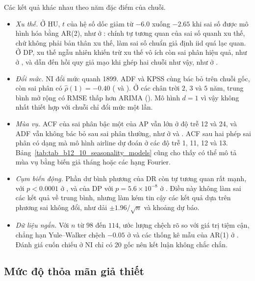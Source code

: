 Các kết quả khác nhau theo năm đặc điểm của chuỗi.
\begin{itemize}[leftmargin=*,itemsep=2pt]
\item \emph{Xu thế.} Ở HU, $t$ của hệ số dốc giảm từ $-6.0$ xuống $-2.65$ khi sai số được mô hình hóa bằng AR(2), như ở : chính tự tương quan của sai số quanh xu thế, chứ không phải bản thân xu thế, làm sai số chuẩn giả định iid quá lạc quan. Ở DP, xu thế ngẫu nhiên khiến trừ xu thế vô ích còn sai phân hiệu quả, như ở , và dẫn đến hồi quy giả mạo khi ghép hai chuỗi như vậy, như ở .
\item \emph{Đổi mức.} NI đổi mức quanh 1899. ADF và KPSS cùng bác bỏ trên chuỗi gốc, còn sai phân có $\hat\rho(1)=-0.40$ ( và ). Ở các chân trời $2$, $3$ và $5$ năm, trung bình mở rộng có RMSE thấp hơn ARIMA (). Mô hình $d=1$ vì vậy không nhất thiết hợp với chuỗi chỉ đổi mức một lần.
\item \emph{Mùa vụ.} ACF của sai phân bậc một của AP vẫn lớn ở độ trễ 12 và 24, và ADF vẫn không bác bỏ sau sai phân thường, như ở  và . ACF sau hai phép sai phân có dạng mà mô hình airline dự đoán ở các độ trễ 1, 11, 12 và 13. Bảng~\ref{tab:tab_b12_10_seasonality_models} cũng cho thấy có thể mô tả mùa vụ bằng biến giả tháng hoặc các hạng Fourier.
\item \emph{Cụm biến động.} Phần dư bình phương của DR còn tự tương quan rất mạnh, với $p<0.0001$ ở , và của DP với $p=5.6\times10^{-8}$ ở . Điều này không làm sai các kết quả về trung bình, nhưng làm kém tin cậy các kết quả dựa trên phương sai không đổi, như dải $\pm1.96/\sqrt n$ và khoảng dự báo.
\item \emph{Dữ liệu ngắn.} Với $n$ từ $98$ đến $114$, ước lượng chệch rõ so với giá trị tiệm cận, chẳng hạn Yule--Walker chệch $-0.05$ ở  và các thống kê mẫu của AR(1) ở . Đánh giá cuốn chiếu ở NI chỉ có $20$ gốc nên kết luận không chắc chắn.
\end{itemize}

\subsection{Mức độ thỏa mãn giả thiết}

